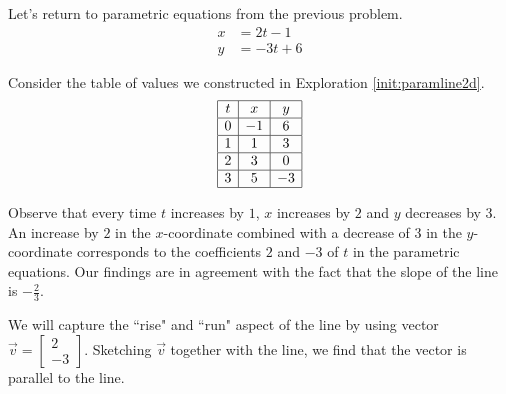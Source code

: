 \documentclass{ximera}
\begin{document}
\begin{exploration}\label{init:paramline2dpart3}
Let's return to parametric equations from the previous problem.
\begin{align*}
x&=2t-1\\
y&=-3t+6
\end{align*}

Consider the table of values we constructed in Exploration \ref{init:paramline2d}.
$$\begin{array}{|c|c|c|}  
 \hline t& x & y\\ 
 \hline 0 & -1 & 6\\ 
 \hline 1 & 1 & 3 \\
 \hline 2 & 3& 0\\
 \hline 3 & 5& -3\\
 \hline
 \end{array}$$

Observe that every time $t$ increases by $1$, $x$ increases by $2$ and $y$ decreases by $3$.  An increase by $2$ in the $x$-coordinate combined with a decrease of $3$ in the $y$-coordinate corresponds to the coefficients $2$ and $-3$ of $t$ in the parametric equations.  Our findings are in agreement with the fact that the slope of the line is $-\frac{2}{3}$.  


We will capture the ``rise" and ``run" aspect of the line by using vector $\vec{v}=\begin{bmatrix}2\\-3\end{bmatrix}$. Sketching $\vec{v}$ together with the line, we find that the vector is parallel to the line.  

 \begin{center}
\end{center}
\end{exploration}
\end{document}
